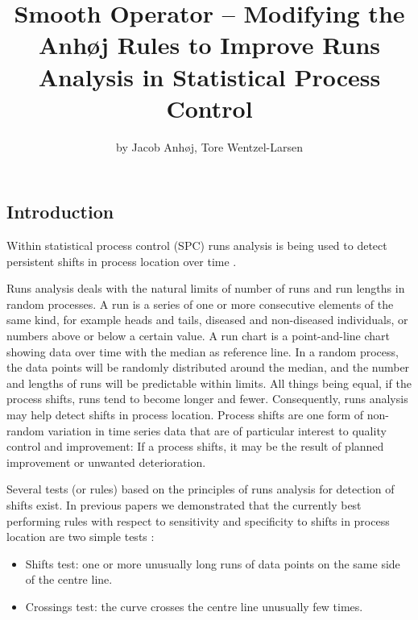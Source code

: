 \title{Smooth Operator -- Modifying the Anhøj Rules to Improve Runs Analysis in
Statistical Process Control}
\author{by Jacob Anhøj, Tore Wentzel-Larsen}

\maketitle



\hypertarget{introduction}{%
\subsection{Introduction}\label{introduction}}

Within statistical process control (SPC) runs analysis is being used to
detect persistent shifts in process location over time
\citep{anhoej2018}.

Runs analysis deals with the natural limits of number of runs and run
lengths in random processes. A run is a series of one or more
consecutive elements of the same kind, for example heads and tails,
diseased and non-diseased individuals, or numbers above or below a
certain value. A run chart is a point-and-line chart showing data over
time with the median as reference line. In a random process, the data
points will be randomly distributed around the median, and the number
and lengths of runs will be predictable within limits. All things being
equal, if the process shifts, runs tend to become longer and fewer.
Consequently, runs analysis may help detect shifts in process location.
Process shifts are one form of non-random variation in time series data
that are of particular interest to quality control and improvement: If a
process shifts, it may be the result of planned improvement or unwanted
deterioration.

Several tests (or rules) based on the principles of runs analysis for
detection of shifts exist. In previous papers we demonstrated that the
currently best performing rules with respect to sensitivity and
specificity to shifts in process location are two simple tests
\citep{anhoej2014, anhoej2015, anhoej2018}:

\begin{itemize}
\item
  Shifts test: one or more unusually long runs of data points on the
  same side of the centre line.
\item
  Crossings test: the curve crosses the centre line unusually few times.
\end{itemize}

